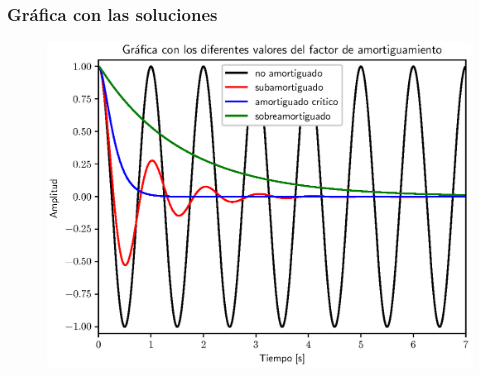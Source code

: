 \documentclass[12pt]{beamer}
\begin{document}
\begin{frame}
\frametitle{Gráfica con las soluciones}
\begin{figure}
    \centering
    \includegraphics[scale=0.55]{Imagenes/plot_Ejercicio_odeint_02_Pendulo_Casos.eps} 
\end{figure}
\end{frame}
\end{document}
